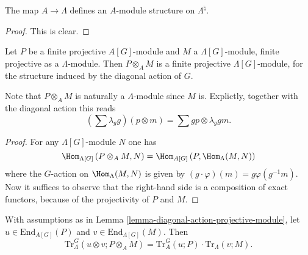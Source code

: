\begin{lemma}
\label{lemma-A-module-structure}
The map $A\to \Lambda$ defines an $A$-module structure on $\Lambda^\natural$.
\end{lemma}

\begin{proof}
This is clear.
\end{proof}

\begin{lemma}
\label{lemma-diagonal-action-projective-module}
Let $P$ be a finite projective $A[G]$-module and $M$ a $\Lambda[G]$-module,
finite projective as a $\Lambda$-module. Then $P \otimes_A M$ is a finite
projective $\Lambda[G]$-module, for the structure induced by the diagonal
action of $G$.
\end{lemma}

\noindent
Note that $P \otimes_A M$ is naturally a $\Lambda$-module since $M$ is.
Explictly, together with the diagonal action this reads
$$
\left(\sum\lambda_g g\right)\left(p \otimes m\right)
=
\sum g p \otimes \lambda_g g m.
$$

\begin{proof}
For any $\Lambda[G]$-module $N$ one has
$$
\Hom_{\Lambda[G]}\left(P \otimes_A M, N\right)= \Hom_{A[G]}\left(P,
\Hom_{\Lambda}(M, N)\right)
$$
where the $G$-action on $\Hom_{\Lambda}(M, N)$ is given by $(g\cdot
\varphi)(m) = g \varphi (g^{-1} m) $. Now it suffices to observe that the
right-hand side is a composition of exact functors, because of the projectivity
of $P$ and $M$.
\end{proof}

\begin{lemma}
\label{lemma-multiplicative-trace}
With assumptions as in
Lemma \ref{lemma-diagonal-action-projective-module},
let
$u\in \text{End}_{A[G]}(P)$ and $v\in \text{End}_{\Lambda[G]}(M)$. Then
$$
\text{Tr}_\Lambda^G \left(u \otimes v; P \otimes_A M\right) = \text{Tr}_A^G(u;
P)\cdot \text{Tr}_\Lambda(v;M).
$$
\end{lemma}


